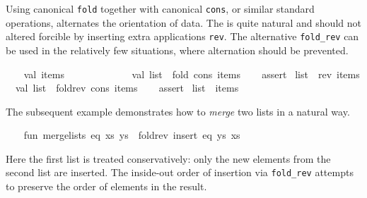 \begin{isabellebody}
\begin{isamarkuptext}
\begin{description}
  \end{description}%
\end{isamarkuptext}%
\isamarkuptrue%
%
\endisatagmlref
{\isafoldmlref}%
%
\isadelimmlref
%
\endisadelimmlref
%
\isadelimmlex
%
\endisadelimmlex
%
\isatagmlex
%
\begin{isamarkuptext}%
Using canonical \verb|fold| together with canonical \verb|cons|, or similar standard operations, alternates the orientation of
  data.  The is quite natural and should not altered forcible by
  inserting extra applications \verb|rev|.  The alternative \verb|fold_rev| can be used in the relatively few situations, where
  alternation should be prevented.%
\end{isamarkuptext}%
\isamarkuptrue%
%
\endisatagmlex
{\isafoldmlex}%
%
\isadelimmlex
%
\endisadelimmlex
%
\isadelimML
%
\endisadelimML
%
\isatagML
{}\isamarkupfalse%
\ {\isacharverbatimopen}\isanewline
\ \ val\ items\ {\isacharequal}\ {\isacharbrackleft}{}{\isacharcomma}\ {}{\isacharcomma}\ {}{\isacharcomma}\ {}{\isacharcomma}\ {}{\isacharcomma}\ {}{\isacharcomma}\ {}{\isacharcomma}\ {}{\isacharcomma}\ {}{\isacharcomma}\ {}{}{\isacharbrackright}{\isacharsemicolon}\isanewline
\isanewline
\ \ val\ list{}\ {\isacharequal}\ fold\ cons\ items\ {\isacharbrackleft}{\isacharbrackright}{\isacharsemicolon}\isanewline
\ \ %
\isaantiq
assert%
\endisaantiq
\ {\isacharparenleft}list{}\ {\isacharequal}\ rev\ items{\isacharparenright}{\isacharsemicolon}\isanewline
\isanewline
\ \ val\ list{}\ {\isacharequal}\ fold{\isacharunderscore}rev\ cons\ items\ {\isacharbrackleft}{\isacharbrackright}{\isacharsemicolon}\isanewline
\ \ %
\isaantiq
assert%
\endisaantiq
\ {\isacharparenleft}list{}\ {\isacharequal}\ items{\isacharparenright}{\isacharsemicolon}\isanewline
{\isacharverbatimclose}%
\endisatagML
{\isafoldML}%
%
\isadelimML
%
\endisadelimML
%
\begin{isamarkuptext}%
The subsequent example demonstrates how to \emph{merge} two
  lists in a natural way.%
\end{isamarkuptext}%
\isamarkuptrue%
%
\isadelimML
%
\endisadelimML
%
\isatagML
{}\isamarkupfalse%
\ {\isacharverbatimopen}\isanewline
\ \ fun\ merge{\isacharunderscore}lists\ eq\ {\isacharparenleft}xs{\isacharcomma}\ ys{\isacharparenright}\ {\isacharequal}\ fold{\isacharunderscore}rev\ {\isacharparenleft}insert\ eq{\isacharparenright}\ ys\ xs{\isacharsemicolon}\isanewline
{\isacharverbatimclose}%
\endisatagML
{\isafoldML}%
%
\isadelimML
%
\endisadelimML
%
\begin{isamarkuptext}%
Here the first list is treated conservatively: only the new
  elements from the second list are inserted.  The inside-out order of
  insertion via \verb|fold_rev| attempts to preserve the order of
  elements in the result.


\end{isamarkuptext}
\end{isabellebody}
